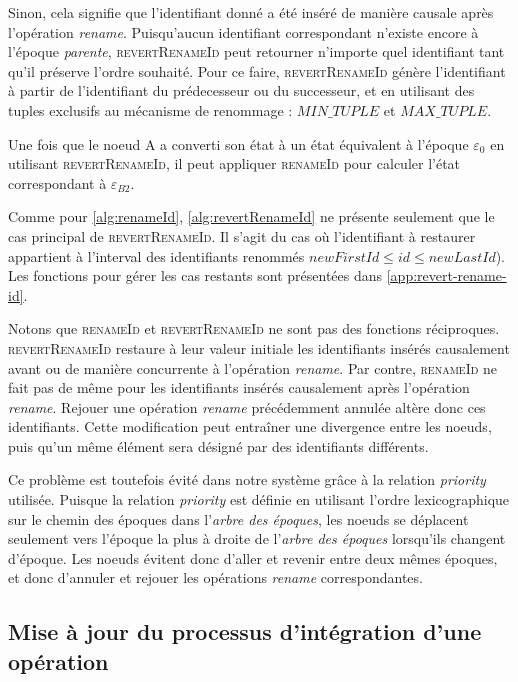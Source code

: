 \documentclass[12pt]{thesul}
\newcommand{\trm}[1]{\mathit{#1}}
\newcommand{\epoch}[1]{$\varepsilon_{#1}$}
\begin{document}
Sinon, cela signifie que l'identifiant donné a été inséré de manière causale après l'opération \emph{rename}.
Puisqu'aucun identifiant correspondant n'existe encore à l'époque \emph{parente}, \textsc{revertRenameId} peut retourner n'importe quel identifiant tant qu'il préserve l'ordre souhaité.
Pour ce faire, \textsc{revertRenameId} génère l'identifiant à partir de l'identifiant du prédecesseur ou du successeur, et en utilisant des tuples exclusifs au mécanisme de renommage : $\trm{MIN\_TUPLE}$ et $\trm{MAX\_TUPLE}$.


Une fois que le noeud A a converti son état à un état équivalent à l'époque \epoch{0} en utilisant \textsc{revertRenameId}, il peut appliquer \textsc{renameId} pour calculer l'état correspondant à \epoch{B2}.

Comme pour \autoref{alg:renameId}, \autoref{alg:revertRenameId} ne présente seulement que le cas principal de \textsc{revertRenameId}.
Il s'agit du cas où l'identifiant à restaurer appartient à l'interval des identifiants renommés $\trm{newFirstId} \leq \trm{id} \leq \trm{newLastId}$).
Les fonctions pour gérer les cas restants sont présentées dans \autoref{app:revert-rename-id}.

Notons que \textsc{renameId} et \textsc{revertRenameId} ne sont pas des fonctions réciproques.
\textsc{revertRenameId} restaure à leur valeur initiale les identifiants insérés causalement avant ou de manière concurrente à l'opération \emph{rename}.
Par contre, \textsc{renameId} ne fait pas de même pour les identifiants insérés causalement après l'opération \emph{rename}.
Rejouer une opération \emph{rename} précédemment annulée altère donc ces identifiants.
Cette modification peut entraîner une divergence entre les noeuds, puis qu'un même élément sera désigné par des identifiants différents.

Ce problème est toutefois évité dans notre système grâce à la relation \emph{priority} utilisée.
Puisque la relation \emph{priority} est définie en utilisant l'ordre lexicographique sur le chemin des époques dans l'\emph{arbre des époques}, les noeuds se déplacent seulement vers l'époque la plus à droite de l'\emph{arbre des époques} lorsqu'ils changent d'époque.
Les noeuds évitent donc d'aller et revenir entre deux mêmes époques, et donc d'annuler et rejouer les opérations \emph{rename} correspondantes.

\subsection{Mise à jour du processus d'intégration d'une opération}
\end{document}
